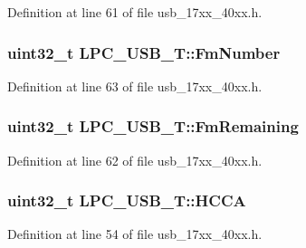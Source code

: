 Definition at line 61 of file usb\+\_\+17xx\+\_\+40xx.\+h.

\subsubsection[{\texorpdfstring{Fm\+Number}{FmNumber}}]{ uint32\+\_\+t L\+P\+C\+\_\+\+U\+S\+B\+\_\+\+T\+::\+Fm\+Number}\hypertarget{structLPC__USB__T_a6df9a7bc955b41f36b193bb3b72d13d9}{}\label{structLPC__USB__T_a6df9a7bc955b41f36b193bb3b72d13d9}


Definition at line 63 of file usb\+\_\+17xx\+\_\+40xx.\+h.

\subsubsection[{\texorpdfstring{Fm\+Remaining}{FmRemaining}}]{ uint32\+\_\+t L\+P\+C\+\_\+\+U\+S\+B\+\_\+\+T\+::\+Fm\+Remaining}\hypertarget{structLPC__USB__T_af9ee5e39de06e7c54665a11c139c1e07}{}\label{structLPC__USB__T_af9ee5e39de06e7c54665a11c139c1e07}


Definition at line 62 of file usb\+\_\+17xx\+\_\+40xx.\+h.

\subsubsection[{\texorpdfstring{H\+C\+CA}{HCCA}}]{ uint32\+\_\+t L\+P\+C\+\_\+\+U\+S\+B\+\_\+\+T\+::\+H\+C\+CA}\hypertarget{structLPC__USB__T_a364bfe1806304b2ec92709a0ee24942d}{}\label{structLPC__USB__T_a364bfe1806304b2ec92709a0ee24942d}


Definition at line 54 of file usb\+\_\+17xx\+\_\+40xx.\+h.

